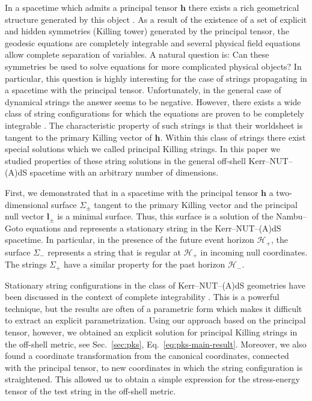 \documentclass[superscriptaddress,twocolumn,showpacs,
preprintnumbers,amsmath,amssymb,nofootinbib,
longbibliography,aps,prd,10pt]{revtex4-1}
\newcommand{\ts}[1]{{\boldsymbol{#1}}}         %
\begin{document}
In a spacetime which admits a principal tensor $\ts{h}$ there exists a rich geometrical structure generated by this object \cite{Frolov:2017kze}. As a result of the existence of a set of explicit and hidden symmetries (Killing tower) generated by the principal tensor, the geodesic equations are completely integrable and several physical field equations allow complete separation of variables. A natural question is: Can these symmetries be used to solve equations for more complicated physical objects? In particular, this question is highly interesting for the case of strings propagating in a spacetime with the principal tensor. Unfortunately, in the general case of dynamical strings the answer seems to be negative. However, there exists a wide class of string configurations for which the equations are proven to be completely integrable \cite{Kubiznak:2007ca}. The characteristic property of such strings is that their worldsheet is tangent to the primary Killing vector of $\ts{h}$. Within this class of strings there exist special solutions which we called principal Killing strings. In this paper we studied properties of these string solutions in the general off-shell Kerr--NUT--(A)dS spacetime with an arbitrary number of dimensions.

First, we demonstrated that in a spacetime with the principal tensor $\ts{h}$ a two-dimensional surface $\Sigma_{\pm}$ tangent to the primary Killing vector and the principal null vector $\ts{l}_{\pm}$ is a minimal surface. Thus, this surface is a solution of the Nambu--Goto equations and represents a stationary string in the Kerr--NUT--(A)dS spacetime. In particular, in the presence of the future event horizon $\mathcal{H}_+$, the surface $\Sigma_-$ represents a string that is regular at $\mathcal{H}_+$ in incoming null coordinates. The strings $\Sigma_+$ have a similar property for the past horizon $\mathcal{H}_-$.

Stationary string configurations in the class of Kerr--NUT--(A)dS geometries have been discussed in the context of complete integrability \cite{Kubiznak:2007ca}. This is a powerful technique, but the results are often of a parametric form which makes it difficult to extract an explicit parametrization. Using our approach based on the principal tensor, however, we obtained an explicit solution for principal Killing strings in the off-shell metric, see Sec.~\ref{sec:pks}, Eq.~\eqref{eq:pks-main-result}. Moreover, we also found a coordinate transformation from the canonical coordinates, connected with the principal tensor, to new coordinates in which the string configuration is straightened. This allowed us to obtain a simple expression for the stress-energy tensor of the test string in the off-shell metric.
\end{document}

